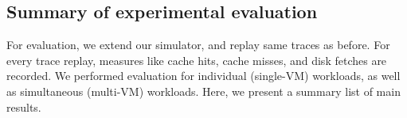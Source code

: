 
\subsection{Summary of experimental evaluation}
For evaluation, we extend our simulator, and replay same traces as before. 
For every trace replay, measures like cache hits, cache misses, and disk fetches are recorded.
We performed evaluation for individual (single-VM) 
workloads, as well as simultaneous (multi-VM) workloads. 
Here, we present a summary list of main results.

